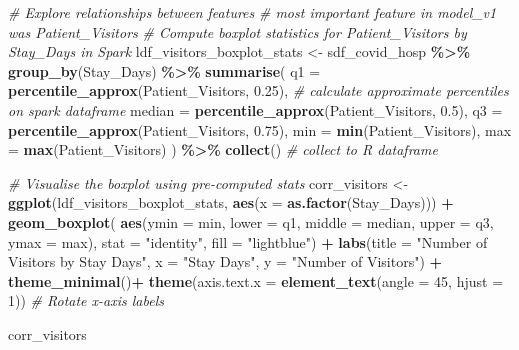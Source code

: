 \documentclass[
]{article}
\newenvironment{Shaded}{\begin{snugshade}}{\end{snugshade}}
\newcommand{\AttributeTok}[1]{\textcolor[rgb]{0.13,0.29,0.53}{#1}}
\newcommand{\CommentTok}[1]{\textcolor[rgb]{0.56,0.35,0.01}{\textit{#1}}}
\newcommand{\DecValTok}[1]{\textcolor[rgb]{0.00,0.00,0.81}{#1}}
\newcommand{\FloatTok}[1]{\textcolor[rgb]{0.00,0.00,0.81}{#1}}
\newcommand{\FunctionTok}[1]{\textcolor[rgb]{0.13,0.29,0.53}{\textbf{#1}}}
\newcommand{\NormalTok}[1]{#1}
\newcommand{\OtherTok}[1]{\textcolor[rgb]{0.56,0.35,0.01}{#1}}
\newcommand{\SpecialCharTok}[1]{\textcolor[rgb]{0.81,0.36,0.00}{\textbf{#1}}}
\newcommand{\StringTok}[1]{\textcolor[rgb]{0.31,0.60,0.02}{#1}}
\begin{document}
\begin{Shaded}
\begin{Highlighting}[]
\CommentTok{\# Explore relationships between features}
\CommentTok{\# most important feature in model\_v1 was Patient\_Visitors}
\CommentTok{\# Compute boxplot statistics for Patient\_Visitors by Stay\_Days in Spark}
\NormalTok{ldf\_visitors\_boxplot\_stats }\OtherTok{\textless{}{-}}\NormalTok{ sdf\_covid\_hosp }\SpecialCharTok{\%\textgreater{}\%}
  \FunctionTok{group\_by}\NormalTok{(Stay\_Days) }\SpecialCharTok{\%\textgreater{}\%}
  \FunctionTok{summarise}\NormalTok{(}
    \AttributeTok{q1 =} \FunctionTok{percentile\_approx}\NormalTok{(Patient\_Visitors, }\FloatTok{0.25}\NormalTok{), }\CommentTok{\# calculate approximate percentiles on spark dataframe  }
    \AttributeTok{median =} \FunctionTok{percentile\_approx}\NormalTok{(Patient\_Visitors, }\FloatTok{0.5}\NormalTok{),}
    \AttributeTok{q3 =} \FunctionTok{percentile\_approx}\NormalTok{(Patient\_Visitors, }\FloatTok{0.75}\NormalTok{),}
    \AttributeTok{min =} \FunctionTok{min}\NormalTok{(Patient\_Visitors),}
    \AttributeTok{max =} \FunctionTok{max}\NormalTok{(Patient\_Visitors)}
\NormalTok{  ) }\SpecialCharTok{\%\textgreater{}\%}
  \FunctionTok{collect}\NormalTok{() }\CommentTok{\# collect to R dataframe }

\CommentTok{\# Visualise the boxplot using pre{-}computed stats}
\NormalTok{corr\_visitors }\OtherTok{\textless{}{-}} \FunctionTok{ggplot}\NormalTok{(ldf\_visitors\_boxplot\_stats, }\FunctionTok{aes}\NormalTok{(}\AttributeTok{x =} \FunctionTok{as.factor}\NormalTok{(Stay\_Days))) }\SpecialCharTok{+}
  \FunctionTok{geom\_boxplot}\NormalTok{(}
    \FunctionTok{aes}\NormalTok{(}\AttributeTok{ymin =}\NormalTok{ min, }\AttributeTok{lower =}\NormalTok{ q1, }\AttributeTok{middle =}\NormalTok{ median, }\AttributeTok{upper =}\NormalTok{ q3, }\AttributeTok{ymax =}\NormalTok{ max),}
    \AttributeTok{stat =} \StringTok{"identity"}\NormalTok{,}
    \AttributeTok{fill =} \StringTok{"lightblue"}\NormalTok{) }\SpecialCharTok{+}
  \FunctionTok{labs}\NormalTok{(}\AttributeTok{title =} \StringTok{"Number of Visitors by Stay Days"}\NormalTok{,}
       \AttributeTok{x =} \StringTok{"Stay Days"}\NormalTok{,}
       \AttributeTok{y =} \StringTok{"Number of Visitors"}\NormalTok{) }\SpecialCharTok{+}
  \FunctionTok{theme\_minimal}\NormalTok{()}\SpecialCharTok{+}
  \FunctionTok{theme}\NormalTok{(}\AttributeTok{axis.text.x =} \FunctionTok{element\_text}\NormalTok{(}\AttributeTok{angle =} \DecValTok{45}\NormalTok{, }\AttributeTok{hjust =} \DecValTok{1}\NormalTok{)) }\CommentTok{\# Rotate x{-}axis labels}

\NormalTok{corr\_visitors}
\end{Highlighting}
\end{Shaded}
\end{document}
